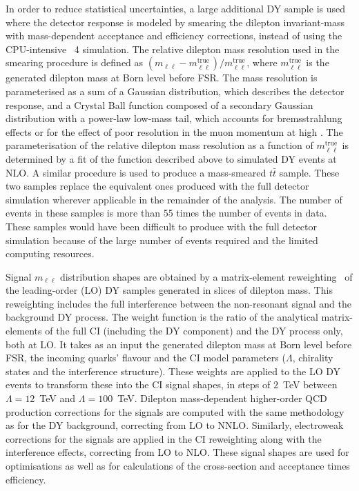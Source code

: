 In order to reduce statistical uncertainties, a large additional DY sample is used where the detector response is modeled by smearing the dilepton invariant-mass with mass-dependent acceptance and efficiency corrections, instead of using the CPU-intensive \GEANT~4 simulation.
The relative dilepton mass resolution used in the smearing procedure is defined as $(m_{\ell\ell}-m_{\ell\ell}^\mathrm{true})/m_{\ell\ell}^\mathrm{true}$, where $m_{\ell\ell}^\mathrm{true}$ is the generated dilepton mass at Born level before FSR.
The mass resolution is parameterised as a sum of a Gaussian distribution, which describes the detector response, and a Crystal Ball function composed of a secondary Gaussian distribution with a power-law low-mass tail,
which accounts for bremsstrahlung effects or for the effect of poor resolution in the muon momentum at high \pt.
The parameterisation of the relative dilepton mass resolution as a function of $m_{\ell\ell}^\mathrm{true}$ is determined by a fit of the function described above to simulated DY events at NLO.
A similar procedure is used to produce a mass-smeared $t\bar{t}$ sample.
These two samples replace the equivalent ones produced with the full detector simulation wherever applicable in the remainder of the analysis.
The number of events in these samples is more than 55 times the number of events in data.
These samples would have been difficult to produce with the full detector simulation because of the large number of events required and the limited computing resources.

Signal $m_{\ell\ell}$ distribution shapes are obtained by a matrix-element reweighting~\cite{EXOT-2016-05} of the leading-order (LO) DY samples generated in slices of dilepton mass.
This reweighting includes the full interference between the non-resonant signal and the background DY process.
The weight function is the ratio of the analytical matrix-elements of the full CI (including the DY component) and the DY process only, both at LO.
It takes as an input the generated dilepton mass at Born level before FSR, the incoming quarks' flavour and the CI model parameters ($\Lambda$, chirality states and the interference structure).
These weights are applied to the LO DY events to transform these into the CI signal shapes, in steps of $2$~TeV between $\Lambda=12$~TeV and $\Lambda=100$~TeV.
Dilepton mass-dependent higher-order QCD production corrections for the signals are computed with the same methodology as for the DY background, correcting from LO to NNLO.
Similarly, electroweak corrections for the signals are applied in the CI reweighting along with the interference effects, correcting from LO to NLO.
These signal shapes are used for optimisations as well as for calculations of the cross-section and acceptance times efficiency.



